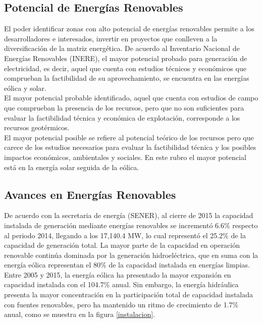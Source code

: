 \subsection{Potencial de Energías Renovables}
El poder identificar zonas con alto potencial de energías renovables permite a los desarrolladores e interesados, invertir en proyectos que conlleven a la diversificación de la matriz energética. 
De acuerdo al Inventario Nacional de Energías Renovables (INERE), el mayor potencial probado para generación de electricidad, es decir, aquel que cuenta con estudios técnicos y económicos que comprueban la factibilidad de su aprovechamiento, se encuentra en las energías eólica y solar.\\

El mayor potencial probable identificado, aquel que cuenta con estudios de campo que comprueban la presencia de los recursos, pero que no son suficientes para evaluar la factibilidad técnica y económica de explotación, corresponde a los recursos geotérmicos.\\

El mayor potencial posible se refiere al potencial teórico de los recursos pero que carece de los estudios necesarios para evaluar la factibilidad técnica y los posibles impactos económicos, ambientales y sociales. En este rubro el mayor potencial está en la energía solar seguida de la eólica.

\subsection{Avances en Energías Renovables}
De acuerdo con la secretaria de energía  (SENER), al cierre de 2015 la capacidad instalada de generación mediante energías renovables se incrementó 6.6\% respecto al periodo 2014, llegando a los 17,140.4 MW, lo cual representó el 25.2\% de la capacidad de generación total. La mayor parte de la capacidad en operación renovable continúa dominada por la generación hidroeléctrica, que en suma con la energía eólica representan el 80\% de la capacidad instalada en energías limpias. Entre 2005 y 2015, la energía eólica ha presentado la mayor expansión en capacidad instalada con el 104.7\% anual. Sin embargo, la energía hidráulica presenta la mayor concentración en la participación total de capacidad instalada con fuentes renovables, pero ha mantenido un ritmo de crecimiento de 1.7\% anual, como se muestra en la figura \ref{instalacion}.

